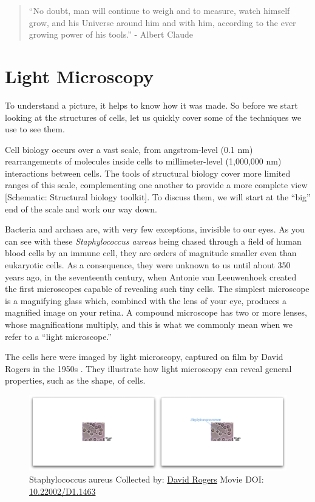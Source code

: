 \documentclass[]{tufte-book}
\begin{document}
\begin{quote}
``No doubt, man will continue to weigh and to measure, watch himself
grow, and his Universe around him and with him, according to the ever
growing power of his tools.'' - Albert Claude \citep{claude1974}
\end{quote}

\section{Light Microscopy}\label{light-microscopy}

To understand a picture, it helps to know how it was made. So before we
start looking at the structures of cells, let us quickly cover some of
the techniques we use to see them.

Cell biology occurs over a vast scale, from angstrom-level (0.1 nm)
rearrangements of molecules inside cells to millimeter-level (1,000,000
nm) interactions between cells. The tools of structural biology cover
more limited ranges of this scale, complementing one another to provide
a more complete view {[}Schematic: Structural biology toolkit{]}. To
discuss them, we will start at the ``big'' end of the scale and work our
way down.

Bacteria and archaea are, with very few exceptions, invisible to our
eyes. As you can see with these \emph{Staphylococcus aureus} being
chased through a field of human blood cells by an immune cell, they are
orders of magnitude smaller even than eukaryotic cells. As a
consequence, they were unknown to us until about 350 years ago, in the
seventeenth century, when Antonie van Leeuwenhoek created the first
microscopes capable of revealing such tiny cells. The simplest
microscope is a magnifying glass which, combined with the lens of your
eye, produces a magnified image on your retina. A compound microscope
has two or more lenses, whose magnifications multiply, and this is what
we commonly mean when we refer to a ``light microscope.''

The cells here were imaged by light microscopy, captured on film by
David Rogers in the 1950s \citep{hillInternet}. They illustrate how
light microscopy can reveal general properties, such as the shape, of
cells.





\begin{figure}
\includegraphics{movie_stills/1_1} \caption[Staphylococcus aureus Collected by:
\protect\hyperlink{david_rogers}{David Rogers} Movie DOI:
\href{https://doi.org/10.22002/D1.1463}{10.22002/D1.1463}]{Staphylococcus aureus Collected by:
\protect\hyperlink{david_rogers}{David Rogers} Movie DOI:
\href{https://doi.org/10.22002/D1.1463}{10.22002/D1.1463}}\label{fig:1-1}
\end{figure}
\end{document}
